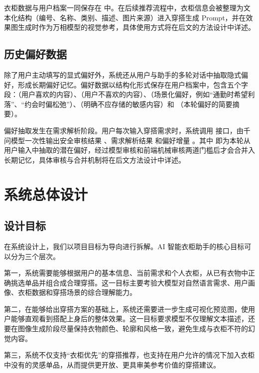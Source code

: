 \documentclass{applemlr}
\begin{document}
衣柜数据与用户档案一同保存在  中。在后续推荐流程中，衣柜信息会被整理为文本化结构（编号、名称、类别、描述、图片来源）进入穿搭生成 Prompt，并在效果图生成时作为万相模型的视觉参考，具体使用方式将在后文的方法设计中详述。

\subsection{历史偏好数据}

除了用户主动填写的显式偏好外，系统还从用户与助手的多轮对话中抽取隐式偏好，形成长期偏好记忆。偏好数据以结构化形式保存在用户档案中，包含五个字段：（用户喜欢的内容）、（用户不喜欢的内容）、（场景化偏好，例如``通勤时希望利落''、``约会时偏松弛''）、（明确不应存储的敏感内容）和 （本轮偏好的简要摘要）。

偏好抽取发生在需求解析阶段。用户每次输入穿搭需求时，系统调用  接口，由千问模型一次性输出安全审核结果 、需求解析结果  和偏好增量 。其中  即为本轮从用户输入中抽取的潜在偏好，经过模型审核和前端机械审核两道门槛后才会合并入长期记忆，具体审核与合并机制将在后文方法设计中详述。


\section{系统总体设计}
\label{sec:system-design}

\subsection{设计目标}

在系统设计上，我们以项目目标为导向进行拆解。AI 智能衣柜助手的核心目标可以分为三个层次。

第一，系统需要能够根据用户的基本信息、当前需求和个人衣柜，从已有衣物中正确挑选单品并组合成合理穿搭。这一目标主要考验大模型对自然语言需求、用户画像、衣柜数据和穿搭场景的综合理解能力。

第二，在能够给出穿搭方案的基础上，系统还需要进一步生成可视化预览图，使用户能够直观看到搭配上身后的整体效果。这一目标要求模型不仅理解文本描述，还要在图像生成阶段尽量保持衣物颜色、轮廓和风格一致，避免生成与衣柜不符的幻觉内容。

第三，系统不仅支持``衣柜优先''的穿搭推荐，也支持在用户允许的情况下加入衣柜中没有的灵感单品，从而提供更开放、更具审美参考价值的穿搭建议。
\end{document}
